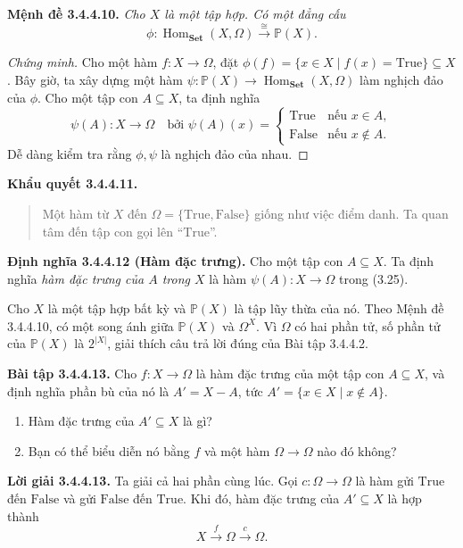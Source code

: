 \noindent\textbf{Mệnh đề 3.4.4.10.} \emph{Cho $X$ là một tập hợp. Có một đẳng cấu}
\[\phi:\operatorname{Hom}_{\mathbf{Set}}(X,\Omega)\xrightarrow{\cong}\mathbb P(X).\]
\begin{proof}[Chứng minh]
Cho một hàm $f:X\to\Omega$, đặt $\phi(f)=\{x\in X\mid f(x)=\mathrm{True}\}\subseteq X$. Bây giờ, ta xây dựng một hàm $\psi:\mathbb P(X)\to\operatorname{Hom}_{\mathbf{Set}}(X,\Omega)$ làm nghịch đảo của $\phi$. Cho một tập con $A\subseteq X$, ta định nghĩa
\begin{equation*}\psi(A):X\to\Omega\quad\text{bởi }\psi(A)(x)=\begin{cases}\mathrm{True}&\text{nếu }x\in A,\\\mathrm{False}&\text{nếu }x\notin A.\end{cases}\tag{3.25}\end{equation*}
Dễ dàng kiểm tra rằng $\phi,\psi$ là nghịch đảo của nhau.
\end{proof}

\noindent\textbf{Khẩu quyết 3.4.4.11.}\keepwithnext
\begin{quote}Một hàm từ $X$ đến $\Omega=\{\mathrm{True},\mathrm{False}\}$ giống như việc điểm danh. Ta quan tâm đến tập con gọi lên ``$\mathrm{True}$''.\end{quote}

\noindent\textbf{Định nghĩa 3.4.4.12 (Hàm đặc trưng).} Cho một tập con $A\subseteq X$. Ta định nghĩa \emph{hàm đặc trưng của $A$ trong $X$} là hàm $\psi(A):X\to\Omega$ trong (3.25).

Cho $X$ là một tập hợp bất kỳ và $\mathbb P(X)$ là tập lũy thừa của nó. Theo Mệnh đề 3.4.4.10, có một song ánh giữa $\mathbb P(X)$ và $\Omega^X$. Vì $\Omega$ có hai phần tử, số phần tử của $\mathbb P(X)$ là $2^{|X|}$, giải thích câu trả lời đúng của Bài tập 3.4.4.2.

\noindent\textbf{Bài tập 3.4.4.13.} Cho $f:X\to\Omega$ là hàm đặc trưng của một tập con $A\subseteq X$, và định nghĩa phần bù của nó là $A'=X-A$, tức $A'=\{x\in X\mid x\notin A\}$.
\begin{enumerate}[label=\alph*.]
\item Hàm đặc trưng của $A'\subseteq X$ là gì?
\item Bạn có thể biểu diễn nó bằng $f$ và một hàm $\Omega\to\Omega$ nào đó không?
\end{enumerate}
\noindent\textbf{Lời giải 3.4.4.13.} Ta giải cả hai phần cùng lúc. Gọi $c:\Omega\to\Omega$ là hàm gửi $\mathrm{True}$ đến $\mathrm{False}$ và gửi $\mathrm{False}$ đến $\mathrm{True}$. Khi đó, hàm đặc trưng của $A'\subseteq X$ là hợp thành
\[X\xrightarrow{f}\Omega\xrightarrow{c}\Omega.\]

